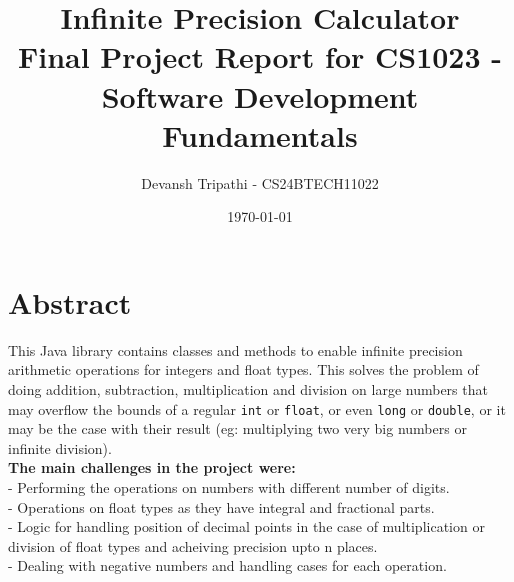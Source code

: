 \documentclass[15pt]{article}
\title{Infinite Precision Calculator\\ \large Final Project Report for CS1023 - Software Development Fundamentals}
\author{Devansh Tripathi - CS24BTECH11022}
\date{\today}
\begin{document}
\maketitle

\newpage
\section{Abstract}

This Java library contains classes and methods to enable infinite precision arithmetic 
operations for integers and float types. This solves the problem of doing addition, 
subtraction, multiplication and division on large numbers that may overflow the bounds 
of a regular \texttt{int} or \texttt{float}, or even \texttt{long} or \texttt{double}, or it may be the case with 
their result (eg: multiplying two very big numbers or infinite division).\\

\textbf{The main challenges in the project were:}\\
- Performing the operations on numbers with different number of digits.\\
- Operations on float types as they have integral and fractional parts.\\
- Logic for handling position of decimal points in the case of multiplication or division of float types and acheiving precision upto n places.\\
- Dealing with negative numbers and handling cases for each operation.
\end{document}
